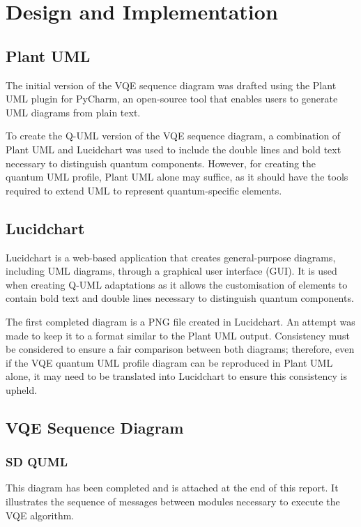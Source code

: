 \documentclass{article}
\begin{document}
\section{Design and Implementation}
\subsection{Plant UML}

The initial version of the VQE sequence diagram was drafted using the Plant UML plugin for PyCharm, an open-source tool that enables users to generate UML diagrams from plain text.

To create the Q-UML version of the VQE sequence diagram, a combination of Plant UML and Lucidchart was used to include the double lines and bold text necessary to distinguish quantum components. However, for creating the quantum UML profile, Plant UML alone may suffice, as it should have the tools required to extend UML to represent quantum-specific elements. 

\subsection{Lucidchart}

Lucidchart is a web-based application that creates general-purpose diagrams, including UML diagrams, through a graphical user interface (GUI). It is used when creating Q-UML adaptations as it allows the customisation of elements to contain bold text and double lines necessary to distinguish quantum components. 

The first completed diagram is a PNG file created in Lucidchart. An attempt was made to keep it to a format similar to the Plant UML output. Consistency must be considered to ensure a fair comparison between both diagrams; therefore, even if the VQE quantum UML profile diagram can be reproduced in Plant UML alone, it may need to be translated into Lucidchart to ensure this consistency is upheld.

\subsection{VQE Sequence Diagram}
\subsubsection{SD QUML}

This diagram has been completed and is attached at the end of this report. It illustrates the sequence of messages between modules necessary to execute the VQE algorithm. 
\end{document}

